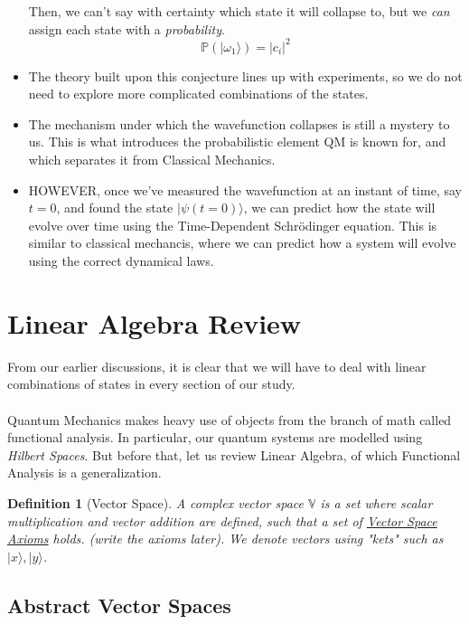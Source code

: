 \documentclass[twoside]{article}
\newcommand{\ket}[1]{|#1 \rangle}
\newcommand{\V}{\mathbb{V}}
\newtheorem{definition}[theorem]{Definition}
\begin{document}
\begin{itemize}
		Then, we can't say with certainty which state it will collapse to, but we \emph{can} assign each state with a \emph{probability}.
		\[ \mathbb{P}\left( \ket{\omega_1} \right) = |c_i|^2 \]			

	\item The theory built upon this conjecture lines up with experiments, so we do not need to explore more complicated combinations of the states.

	\item The mechanism under which the wavefunction collapses is still a mystery to us. This is what introduces the probabilistic element QM is known for, and which 			separates it from Classical Mechanics. 

	\item HOWEVER, once we've measured the wavefunction at an instant of time, say $t = 0$, and found the state $\ket{\psi(t=0)}$, we can predict how the 				state will evolve over time using the Time-Dependent Schrödinger equation. This is similar to classical mechancis, where we can predict how a system will 				evolve using the correct dynamical laws.
\end{itemize}

\section{Linear Algebra Review}
From our earlier discussions, it is clear that we will have to deal with linear combinations of states in every section of our study. 
\\
\\
Quantum Mechanics makes heavy use of objects from the branch of math called functional analysis. In particular, our quantum systems are modelled using \emph{Hilbert Spaces}. But before that, let us review Linear Algebra, of which Functional Analysis is a generalization.

\begin{definition}[Vector Space]
A complex vector space $\V$ is a set where scalar multiplication and vector addition are defined, such that a set of \underline{Vector Space Axioms} holds. (write the axioms later). We denote vectors using "kets" such as $\ket{x}, \ket{y}$.
\end{definition}

\subsection*{Abstract Vector Spaces}
\end{document}
